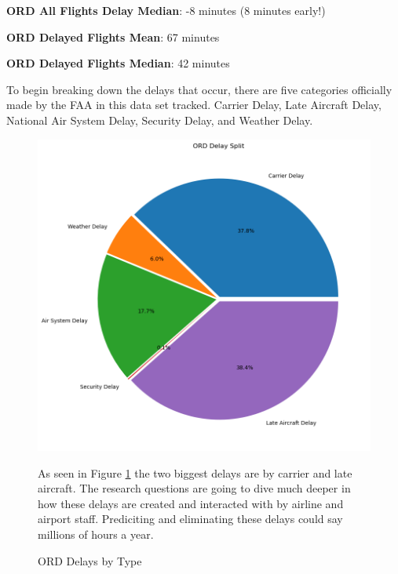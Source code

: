 \documentclass[a4paper,12pt]{article}
\begin{document}
\textbf{ORD All Flights Delay Median}: -8 minutes (8 minutes early!)

\textbf{ORD Delayed Flights Mean}: 67 minutes

\textbf{ORD Delayed Flights Median}: 42 minutes

To begin breaking down the delays that occur, there are five categories officially made by the FAA in this data set tracked. Carrier Delay, Late Aircraft Delay, National Air System Delay, Security Delay, and Weather Delay.

\begin{figure}
    \centering
    \includegraphics*[scale=.5]{../../img/ord_delay_split_pie.png}
    \caption[Delays by Type]{ORD Delays by Type}
    \label{fig:delaybytype}
    As seen in Figure \ref{fig:delaybytype} the two biggest delays are by carrier and late aircraft. The research questions are going to dive much deeper in how these delays are created and interacted with by airline and airport staff. Prediciting and eliminating 
    these delays could say millions of hours a year.
\end{figure}
\end{document}

